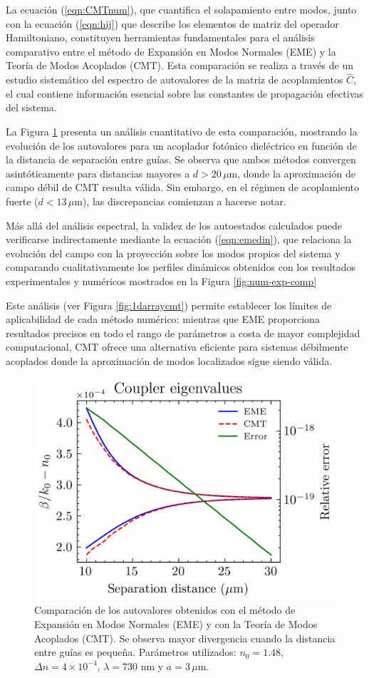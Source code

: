 La ecuación (\ref{eqn:CMTnum}), que cuantifica el solapamiento entre modos, junto con la ecuación (\ref{eqn:hij}) que describe los elementos de matriz del operador Hamiltoniano, constituyen herramientas fundamentales para el análisis comparativo entre el método de Expansión en Modos Normales (EME) y la Teoría de Modos Acoplados (CMT). Esta comparación se realiza a través de un estudio sistemático del espectro de autovalores de la matriz de acoplamientos $\hat{C}$, el cual contiene información esencial sobre las constantes de propagación efectivas del sistema. 

La Figura \ref{fig:EMECMT} presenta un análisis cuantitativo de esta comparación, mostrando la evolución de los autovalores para un acoplador fotónico dieléctrico en función de la distancia de separación entre guías. Se observa que ambos métodos convergen asintóticamente para distancias mayores a $d > 20\,\mu$m, donde la aproximación de campo débil de CMT resulta válida. Sin embargo, en el régimen de acoplamiento fuerte ($d < 13\,\mu$m), las discrepancias comienzan a hacerse notar.

Más allá del análisis espectral, la validez de los autoestados calculados puede verificarse indirectamente mediante la ecuación (\ref{eqn:emedin}), que relaciona la evolución del campo con la proyección sobre los modos propios del sistema y comparando cualitativamente los perfiles dinámicos obtenidos con los resultados experimentales y numéricos mostrados en la Figura \ref{fig:num-exp-comp}

Este análisis (ver Figura \ref{fig:1darraycmt}) permite establecer los límites de aplicabilidad de cada método numérico: mientras que EME proporciona resultados precisos en todo el rango de parámetros a costa de mayor complejidad computacional, CMT ofrece una alternativa eficiente para sistemas débilmente acoplados donde la aproximación de modos localizados sigue siendo válida.
\begin{figure}[h]
    \centering
    \includegraphics[width=0.65\linewidth]{codigo/dimol/coupler.png}
    \caption[Comparación entre EME y CMT.]{Comparación de los autovalores obtenidos con el método de Expansión en Modos Normales (EME) y con la Teoría de Modos Acoplados (CMT). Se observa mayor divergencia cuando la distancia entre guías es pequeña. Parámetros utilizados: $n_0=1.48$, $\Delta n = 4\times10^{-4}$, $\lambda = 730$ nm y $a = 3\,\mu$m.}
    \label{fig:EMECMT}
\end{figure}



